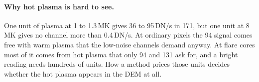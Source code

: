 \paragraph{Why hot plasma is hard to see.}
One unit of plasma at 1 to 1.3\,MK gives 36 to 95\,DN/s in 171\Ang, but one unit at 8\,MK gives no channel more than 0.4\,DN/s. At ordinary pixels the 94\Ang{} signal comes free with warm plasma that the low-noise channels demand anyway. At flare cores most of it comes from hot plasma that only 94 and 131\Ang{} ask for, and a bright reading needs hundreds of units. How a method prices those units decides whether the hot plasma appears in the DEM at all.
